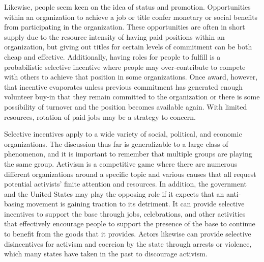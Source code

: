 Likewise, people seem keen on the idea of status and promotion. Opportunities within an organization to achieve a job or title confer monetary or social benefits from participating in the organization. These opportunities are often in short supply due to the resource intensity of having paid positions within an organization, but giving out titles for certain levels of commitment can be both cheap and effective. Additionally, having roles for people to fulfill is a probabilistic selective incentive where people may over-contribute to compete with others to achieve that position in some organizations. Once award, however, that incentive evaporates unless previous commitment has generated enough volunteer buy-in that they remain committed to the organization or there is some possibility of turnover and the position becomes available again. With limited resources, rotation of paid jobs may be a strategy to concern.

Selective incentives apply to a wide variety of social, political, and economic organizations. The discussion thus far is generalizable to a large class of phenomenon, and it is important to remember that multiple groups are playing the same group. Activism is a competitive game where there are numerous different organizations around a specific topic and various causes that all request potential activists' finite attention and resources. In addition, the government and the United States may play the opposing role if it expects that an anti-basing movement is gaining traction to its detriment. It can provide selective incentives to support the base through jobs, celebrations, and other activities that effectively encourage people to support the presence of the base to continue to benefit from the goods that it provides. Actors likewise can provide selective disincentives for activism and coercion by the state through arrests or violence, which many states have taken in the past to discourage activism.

